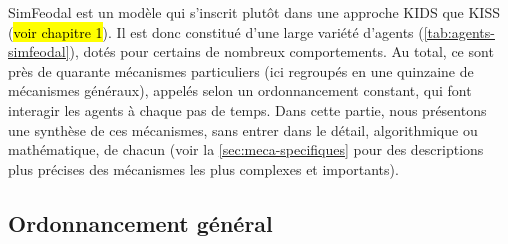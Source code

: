 SimFeodal est un modèle qui s'inscrit plutôt dans une approche KIDS que KISS (\hl{voir chapitre 1}).
Il est donc constitué d'une large variété d'agents (\cref{tab:agents-simfeodal}), dotés pour certains de nombreux comportements.
Au total, ce sont près de quarante mécanismes particuliers (ici regroupés en une quinzaine de mécanismes généraux), appelés selon un ordonnancement constant, qui font interagir les agents à chaque pas de temps.
Dans cette partie, nous présentons une synthèse de ces mécanismes, sans entrer dans le détail, algorithmique ou mathématique, de chacun (voir la \cref{sec:meca-specifiques} pour des descriptions plus précises des mécanismes les plus complexes et importants).

\subsection*{Ordonnancement général \label{meca-ordonancement}}

